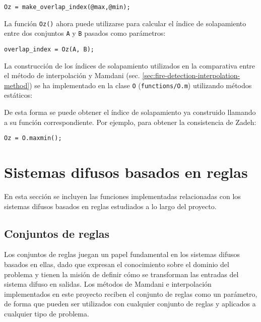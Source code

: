 \begin{lstlisting}
Oz = make_overlap_index(@max,@min);
\end{lstlisting}

La función \lstinline|Oz()| ahora puede utilizarse para calcular el índice de solapamiento entre dos conjuntos \lstinline|A| y \lstinline|B| pasados como parámetros:

\begin{lstlisting}
overlap_index = Oz(A, B);
\end{lstlisting}
 
La construcción de los índices de solapamiento utilizados en la comparativa entre el método de interpolación y Mamdani (sec. \ref{sec:fire-detection-interpolation-method}) se ha implementado en la clase \lstinline|O| (\lstinline|functions/O.m|) utilizando métodos estáticos:



De esta forma se puede obtener el índice de solapamiento ya construido llamando a su función correspondiente. Por ejemplo, para obtener la consistencia de Zadeh:

\begin{lstlisting}
Oz = O.maxmin();
\end{lstlisting}

\section{Sistemas difusos basados en reglas}
En esta sección se incluyen las funciones implementadas relacionadas con los sistemas difusos basados en reglas estudiados a lo largo del proyecto.

\subsection{Conjuntos de reglas}\label{sec:matlab-rule-base}
Los conjuntos de reglas juegan un papel fundamental en los sistemas difusos basados en ellas, dado que expresan el conocimiento sobre el dominio del problema y tienen la misión de definir cómo se transforman las entradas del sistema difuso en salidas. Los métodos de Mamdani e interpolación implementados en este proyecto reciben el conjunto de reglas como un parámetro, de forma que pueden ser utilizados con cualquier conjunto de reglas y aplicados a cualquier tipo de problema.

